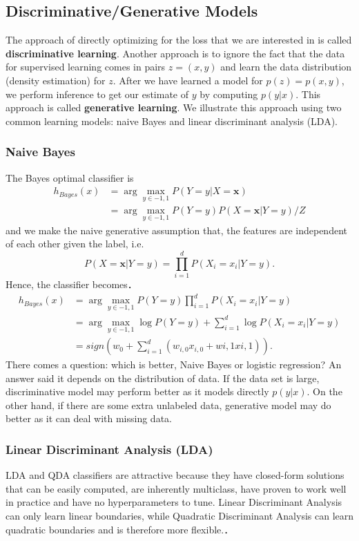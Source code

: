 \documentclass{article}
\begin{document}
    \subsection{Discriminative/Generative Models}
    The approach of directly optimizing for the loss that we are interested in is called \textbf{discriminative learning}. Another approach is to ignore the fact that the data for supervised learning comes in pairs $z=(x,y)$ and learn the data distribution (density estimation) for $z$. After we have learned a model for $p(z) = p(x,y)$, we perform inference to get our estimate of $y$ by computing $p(y|x)$. This approach is called \textbf{generative learning}. We illustrate this approach using two common learning models: naive Bayes and linear discriminant analysis (LDA).
    
   \subsubsection{Naive Bayes}
   The Bayes optimal classifier is 
   \begin{align}
   h_{Bayes}(x) &= \arg\max_{y \in {-1, 1}} P(Y=y|X=\textbf{x}) \\
   				&= \arg\max_{y \in {-1, 1}} P(Y=y)P(X=\textbf{x}|Y=y)/Z
   \end{align}
   and we make the naive generative assumption that, the features are independent of each other given the label, i.e.
   \begin{equation}
   P(X=\textbf{x}|Y=y) = \prod_{i=1}^d P(X_i=x_i|Y=y).
   \end{equation}
   Hence, the classifier becomes．
   \begin{align}
   h_{Bayes}(x) &= \arg\max_{y \in {-1, 1}} P(Y=y) \prod_{i=1}^d P(X_i=x_i|Y=y) \\
   &= \arg\max_{y \in {-1, 1}} \log P(Y=y) + \sum_{i=1}^d \log P(X_i=x_i|Y=y) \\
   &= sign(w_0 + \sum_{i=1}^d(w_{i,0}x_{i,0}+w{i,1}x{i,1})).
   \end{align}
   There comes a question: which is better, Naive Bayes or logistic regression? An answer \cite{4690} said it depends on the distribution of data. If the data set is large, discriminative model may perform better as it models directly $p(y|x)$. On the other hand, if there are some extra unlabeled data, generative model may do better as it can deal with missing data.
   
   \subsubsection{Linear Discriminant Analysis (LDA)}
   LDA and QDA classifiers are attractive because they have closed-form solutions that can be easily computed, are inherently multiclass, have proven to work well in practice and have no hyperparameters to tune. Linear Discriminant Analysis can only learn linear boundaries, while Quadratic Discriminant Analysis can learn quadratic boundaries and is therefore more flexible.．
   
\end{document}
